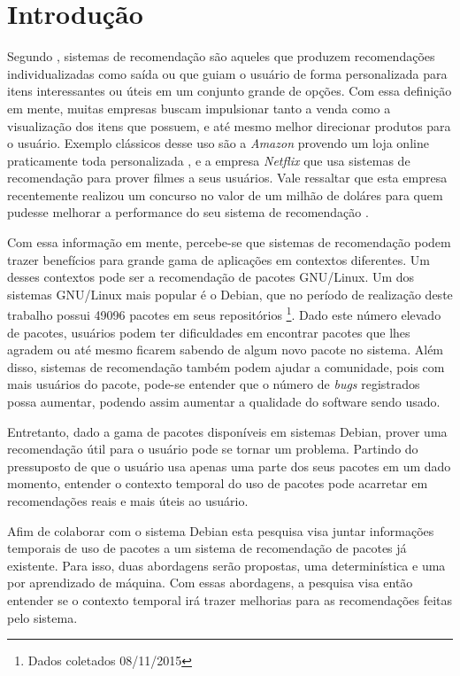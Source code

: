 \chapter[Introdução]{Introdução}

Segundo , sistemas de recomendação são aqueles que
produzem recomendações individualizadas como saída ou que guiam o usuário
de forma personalizada para itens interessantes ou úteis em um conjunto
grande de opções. Com essa definição em mente, muitas empresas buscam
impulsionar tanto a venda como a visualização dos itens que possuem, e até mesmo
melhor direcionar produtos para o usuário. Exemplo clássicos desse uso são a
\textit{Amazon} provendo um loja online praticamente toda personalizada
\cite{jannach2008finding}, e a empresa \textit{Netflix} que usa sistemas de recomendação
para prover filmes a seus usuários. Vale ressaltar que esta empresa recentemente
realizou um concurso no valor de um milhão de doláres para quem pudesse melhorar
a performance do seu sistema de recomendação \cite{koren2009matrix}.

Com essa informação em mente, percebe-se que sistemas de recomendação podem
trazer benefícios para grande gama de aplicações em contextos diferentes. Um
desses contextos pode ser a recomendação de pacotes GNU/Linux. Um dos sistemas
GNU/Linux mais popular é o Debian, que no período de realização deste trabalho
possui 49096 pacotes em seus repositórios \footnote{Dados coletados
08/11/2015}. Dado este número elevado de pacotes, usuários podem ter
dificuldades em encontrar pacotes que lhes agradem ou até mesmo ficarem sabendo
de algum novo pacote no sistema. Além disso, sistemas de recomendação também
podem ajudar a comunidade, pois com mais usuários do pacote, pode-se entender que
o número de \textit{bugs} registrados possa aumentar, podendo assim aumentar a qualidade
do software sendo usado.

Entretanto, dado a gama de pacotes disponíveis em sistemas Debian, prover uma
recomendação útil para o usuário pode se tornar um problema. Partindo do
pressuposto de que o usuário usa apenas uma parte dos seus pacotes em um dado
momento, entender o contexto temporal  do uso de pacotes pode acarretar em recomendações reais e
mais úteis ao usuário.

Afim de colaborar com o sistema Debian esta pesquisa visa juntar informações
temporais de uso de pacotes a um sistema de recomendação de pacotes já existente.
Para isso, duas abordagens serão propostas, uma determinística e uma por aprendizado
de máquina. Com essas abordagens, a pesquisa visa então entender se o contexto temporal
irá trazer melhorias para as recomendações feitas pelo sistema.

